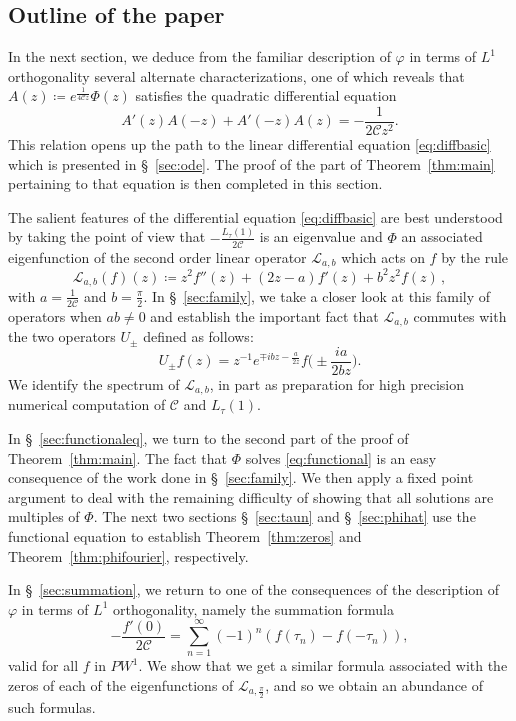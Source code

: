 \documentclass[12pt]{amsart}
\theoremstyle{plain}
\numberwithin{equation}{section}
\theoremstyle{definition}
\newcommand{\Cone}{\mathscr{C}}
\begin{document}
\subsection*{Outline of the paper} In the next section, we deduce from the familiar description of $\varphi$ in terms of $L^1$ orthogonality several alternate characterizations, one of which reveals that 
$A(z)\coloneqq e^{\frac{1}{4\Cone z}} \Phi(z)$ satisfies the quadratic differential equation
\[ A'(z)A(-z)+A'(-z)A(z)=-\frac{1}{2\Cone z^2}. \]
This relation opens up the path to the linear differential equation \eqref{eq:diffbasic} which is presented in \S~\ref{sec:ode}. The proof of the part of Theorem~\ref{thm:main} pertaining to that equation is then completed in this section.

The salient features of the differential equation \eqref{eq:diffbasic} are  best understood by taking the point of view that $-\frac{L_\tau(1)}{2\Cone}$ is an eigenvalue and $\Phi$ an associated eigenfunction of the second order linear operator $\mathcal{L}_{a,b}$ which acts on $f$ by the rule
\[ \mathcal{L}_{a,b}(f)(z) \coloneqq z^2f''(z) + (2z-a)f'(z) + b^2z^2f(z)\, ,\] 
with $a=\frac{1}{2\Cone}$ and $b=\frac{\pi}{2}$. In \S~\ref{sec:family}, we take a closer look at this family of operators when $ab\neq 0$ and establish the important fact that $\mathcal{L}_{a,b}$ commutes with the two operators $U_{\pm}$ defined as follows:
		\[U_{\pm}f(z) = z^{-1}e^{\mp i bz -\frac{a}{2z}}f\Big(\pm
\frac{ia}{2bz}\Big).\]
We identify the spectrum of $\mathcal{L}_{a,b}$, in part as preparation for high precision numerical computation of $\Cone$ and $L_\tau(1)$.

In \S~\ref{sec:functionaleq}, we turn to the second part of the proof of Theorem~\ref{thm:main}. The fact that $\Phi$ solves \eqref{eq:functional} is an easy consequence of the work done in \S~\ref{sec:family}. We then apply a fixed point argument to deal with the remaining difficulty of showing that all solutions are multiples of $\Phi$. The next two sections \S~\ref{sec:taun} and \S~\ref{sec:phihat} use the functional equation to establish Theorem~\ref{thm:zeros} and Theorem~\ref{thm:phifourier}, respectively.

In \S~\ref{sec:summation}, we return to one of the consequences of the description of $\varphi$ in terms of $L^1$ orthogonality, namely the summation formula
\[
-\frac{f'(0)}{2\Cone} = \sum_{n= 1}^\infty (-1)^n(f(\tau_n)-f(-\tau_n)),
\]
valid for all $f$ in $PW^1$. We show that we get a similar formula associated with the zeros of each of the eigenfunctions of $\mathcal{L}_{a,\frac{\pi}2}$, and so we obtain an abundance of such formulas. 
\end{document}
